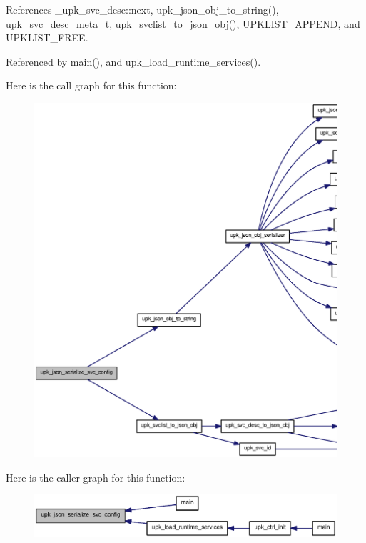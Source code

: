 References \_\-upk\_\-svc\_\-desc::next, upk\_\-json\_\-obj\_\-to\_\-string(), upk\_\-svc\_\-desc\_\-meta\_\-t, upk\_\-svclist\_\-to\_\-json\_\-obj(), UPKLIST\_\-APPEND, and UPKLIST\_\-FREE.



Referenced by main(), and upk\_\-load\_\-runtime\_\-services().



Here is the call graph for this function:\nopagebreak
\begin{figure}[H]
\begin{center}
\leavevmode
\includegraphics[width=400pt]{group__config__impl_ga19d2bc0bd2e96a937820f26f4e56b2d9_cgraph}
\end{center}
\end{figure}




Here is the caller graph for this function:\nopagebreak
\begin{figure}[H]
\begin{center}
\leavevmode
\includegraphics[width=400pt]{group__config__impl_ga19d2bc0bd2e96a937820f26f4e56b2d9_icgraph}
\end{center}
\end{figure}


